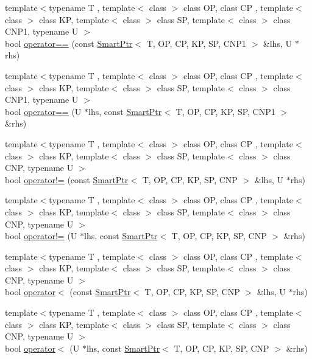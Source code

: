 \begin{DoxyCompactItemize}
\item 
{\footnotesize template$<$typename T , template$<$ class $>$ class O\+P, class C\+P , template$<$ class $>$ class K\+P, template$<$ class $>$ class S\+P, template$<$ class $>$ class C\+N\+P1, typename U $>$ }\\bool \hyperlink{group__SmartPointerGroup_ga6367f7dd2ba62b272c7a14b2d5db3e01}{operator==} (const \hyperlink{classLoki_1_1SmartPtr}{Smart\+Ptr}$<$ T, O\+P, C\+P, K\+P, S\+P, C\+N\+P1 $>$ \&lhs, U $\ast$rhs)
\item 
{\footnotesize template$<$typename T , template$<$ class $>$ class O\+P, class C\+P , template$<$ class $>$ class K\+P, template$<$ class $>$ class S\+P, template$<$ class $>$ class C\+N\+P1, typename U $>$ }\\bool \hyperlink{group__SmartPointerGroup_ga7f01888cb34c0dd52ded70b83ee20e06}{operator==} (U $\ast$lhs, const \hyperlink{classLoki_1_1SmartPtr}{Smart\+Ptr}$<$ T, O\+P, C\+P, K\+P, S\+P, C\+N\+P1 $>$ \&rhs)
\item 
{\footnotesize template$<$typename T , template$<$ class $>$ class O\+P, class C\+P , template$<$ class $>$ class K\+P, template$<$ class $>$ class S\+P, template$<$ class $>$ class C\+N\+P, typename U $>$ }\\bool \hyperlink{group__SmartPointerGroup_ga4737a73b3c8d0a42d5f1f94526728f75}{operator!=} (const \hyperlink{classLoki_1_1SmartPtr}{Smart\+Ptr}$<$ T, O\+P, C\+P, K\+P, S\+P, C\+N\+P $>$ \&lhs, U $\ast$rhs)
\item 
{\footnotesize template$<$typename T , template$<$ class $>$ class O\+P, class C\+P , template$<$ class $>$ class K\+P, template$<$ class $>$ class S\+P, template$<$ class $>$ class C\+N\+P, typename U $>$ }\\bool \hyperlink{group__SmartPointerGroup_ga7ed292fb9144360e60f0589f7387ec67}{operator!=} (U $\ast$lhs, const \hyperlink{classLoki_1_1SmartPtr}{Smart\+Ptr}$<$ T, O\+P, C\+P, K\+P, S\+P, C\+N\+P $>$ \&rhs)
\item 
{\footnotesize template$<$typename T , template$<$ class $>$ class O\+P, class C\+P , template$<$ class $>$ class K\+P, template$<$ class $>$ class S\+P, template$<$ class $>$ class C\+N\+P, typename U $>$ }\\bool \hyperlink{group__SmartPointerGroup_ga1e7dc23efb70f2a1ebdf633ba941a3a9}{operator$<$} (const \hyperlink{classLoki_1_1SmartPtr}{Smart\+Ptr}$<$ T, O\+P, C\+P, K\+P, S\+P, C\+N\+P $>$ \&lhs, U $\ast$rhs)
\item 
{\footnotesize template$<$typename T , template$<$ class $>$ class O\+P, class C\+P , template$<$ class $>$ class K\+P, template$<$ class $>$ class S\+P, template$<$ class $>$ class C\+N\+P, typename U $>$ }\\bool \hyperlink{group__SmartPointerGroup_ga077391f2d5ea6f967f6c948817fe4378}{operator$<$} (U $\ast$lhs, const \hyperlink{classLoki_1_1SmartPtr}{Smart\+Ptr}$<$ T, O\+P, C\+P, K\+P, S\+P, C\+N\+P $>$ \&rhs)

\end{DoxyCompactItemize}
